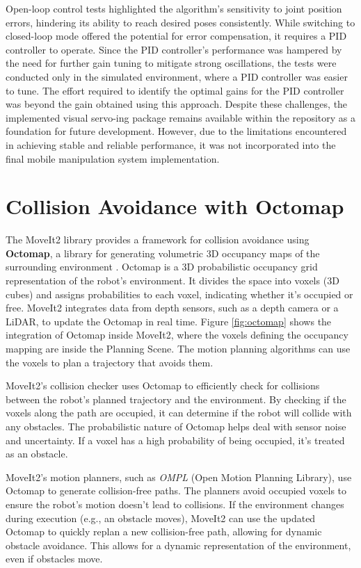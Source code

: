 Open-loop control tests highlighted the algorithm's sensitivity to joint position errors, hindering its ability
to reach desired poses consistently. While switching to closed-loop mode offered the potential for error compensation, 
it requires a PID controller to operate. Since the PID controller's performance was hampered by the need for 
further gain tuning to mitigate strong oscillations, the tests were conducted only in the simulated environment,
where a PID controller was easier to tune. The effort required to identify the optimal gains for the PID controller
was beyond the gain obtained using this approach.
Despite these challenges, the implemented visual servo-ing package remains available within the repository as a foundation
for future development. However, due to the limitations encountered in achieving stable and reliable performance,
it was not incorporated into the final mobile manipulation system implementation.

\section{Collision Avoidance with Octomap}

The MoveIt2 library provides a framework for collision avoidance using \textbf{Octomap}, a library for
generating volumetric 3D occupancy maps of the surrounding environment \cite{hornung13octomap}.
Octomap is a 3D probabilistic occupancy grid representation of the robot's environment. It divides the space into voxels
(3D cubes) and assigns probabilities to each voxel, indicating whether it's occupied or free.
MoveIt2 integrates data from depth sensors, such as a depth camera or a LiDAR, to update the Octomap in real time.
Figure \ref{fig:octomap} shows the integration of Octomap inside MoveIt2, where the voxels defining the occupancy
mapping are inside the Planning Scene. The motion planning algorithms can use the voxels to plan a trajectory
that avoids them.

MoveIt2's collision checker uses Octomap to efficiently check for collisions between the robot's planned trajectory
and the environment. By checking if the voxels along the path are occupied, it can determine if the robot will collide 
with any obstacles. The probabilistic nature of Octomap helps deal with sensor noise and uncertainty. 
If a voxel has a high probability of being occupied, it's treated as an obstacle.

MoveIt2's motion planners, such as \textit{OMPL} (Open Motion Planning Library), use Octomap
to generate collision-free paths. The planners avoid occupied voxels to ensure the robot's motion doesn't lead to collisions.
If the environment changes during execution (e.g., an obstacle moves), MoveIt2 can use the updated Octomap 
to quickly replan a new collision-free path, allowing for dynamic obstacle avoidance.
This allows for a dynamic representation of the environment, even if obstacles move.


